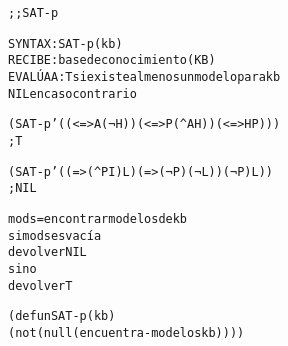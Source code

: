 \begin{aibox}{\function}
\begin{alltt}
;; SAT-p

SYNTAX: SAT-p (kb)
RECIBE   : base de conocimiento (KB)
EVALÚA A : T si existe al menos un modelo para kb
            NIL en caso contrario
\end{alltt}
\end{aibox}

\begin{aibox}{\examples}
\begin{alltt}
(SAT-p '((<=> A (¬ H)) (<=> P (^ A H)) (<=> H P))) 
; T

(SAT-p '((=> (^ P I) L) (=> (¬ P) (¬ L)) (¬ P) L)) 
; NIL
\end{alltt}

\end{aibox}

\begin{aibox}{\comments}

\end{aibox}
\begin{aibox}{\pseudocode}
\begin{alltt}
mods = encontrar modelos de kb
si mods es vacía
    devolver NIL
si no
    devolver T
\end{alltt}
\end{aibox}
\begin{aibox}{\code}

\begin{alltt}

(defun SAT-p (kb)
  (not (null (encuentra-modelos kb))))

\end{alltt}
\end{aibox}
